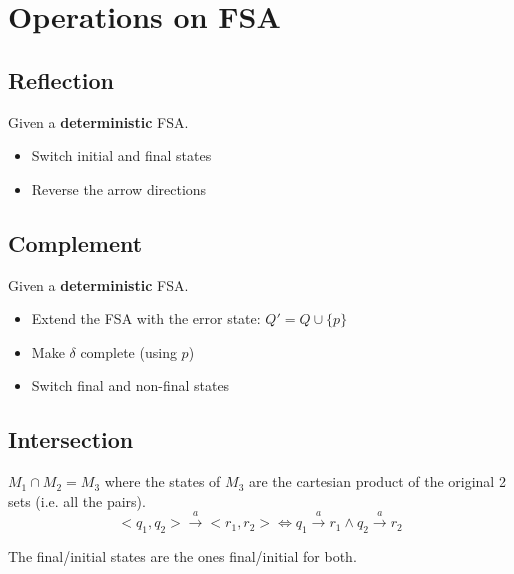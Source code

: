 \section{Operations on FSA}

\subsection{Reflection}
Given a \textbf{deterministic} FSA.
\begin{itemize}
    \item Switch initial and final states
    \item Reverse the arrow directions
\end{itemize}

\subsection{Complement}
Given a \textbf{deterministic} FSA.
\begin{itemize}
    \item Extend the FSA with the error state: $Q' = Q \cup \{p\}$
    \item Make $\delta$ complete (using $p$)
    \item Switch final and non-final states
\end{itemize}

\subsection{Intersection}
$M_1 \cap M_2 = M_3$ where the states of $M_3$ are the cartesian product of the original 2 sets (i.e. all the pairs).
\[
    <q_1, q_2> \xrightarrow{a} <r_1,r_2> \iff q_1\xrightarrow{a} r_1 \land q_2 \xrightarrow{a} r_2
\]

The final/initial states are the ones final/initial for both.
